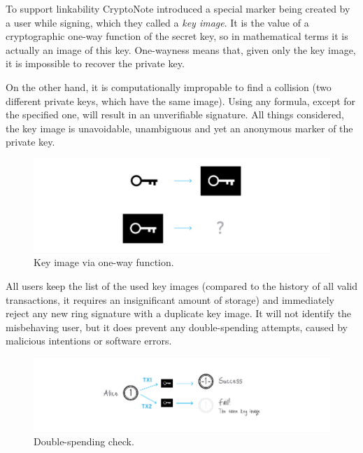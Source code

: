 To support linkability CryptoNote introduced a special marker being created by a user while signing, which they called a \emph{key image}. It is the value of a cryptographic one-way function of the secret key, so in mathematical terms it is actually an image of this key. One-wayness means that, given only the key image, it is impossible to recover the private key.

On the other hand, it is computationally impropable to find a collision (two different private keys, which have the same image). Using any formula, except for the specified one, will result in an unverifiable signature. All things considered, the key image is unavoidable, unambiguous and yet an anonymous marker of the private key.
\vspace{0.3cm}
\begin{figure}[H]
  \centering
  \includegraphics[width=1 \columnwidth,keepaspectratio]{Images/CryptoNote/key_image.png}
  \caption{Key image via one-way function.~\cite{cryptonote}}
  \label{fig:key_image}
\end{figure}
\vspace{0.2cm}

All users keep the list of the used key images (compared to the history of all valid transactions, it requires an insignificant amount of storage) and immediately reject any new ring signature with a duplicate key image. It will not identify the misbehaving user, but it does prevent any double-spending attempts, caused by malicious intentions or software errors.
\begin{figure}[H]
  \centering
  \includegraphics[width=1.2 \columnwidth,keepaspectratio]{Images/CryptoNote/double_spending.png}
  \caption{Double-spending check.~\cite{cryptonote}}
  \label{fig:double_spending}
\end{figure}
\vspace{0.2cm}


